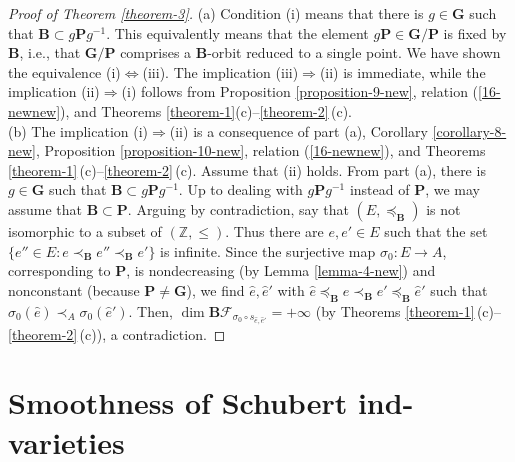 \documentclass[12pt]{amsart}
\theoremstyle{definition}
\begin{document}
\begin{proof}[Proof of Theorem \ref{theorem-3}]
{\rm (a)} Condition {\rm (i)} means that there is $g\in \mathbf{G}$ such that $\mathbf{B}\subset g\mathbf{P}g^{-1}$. This equivalently means that the element $g\mathbf{P}\in\mathbf{G}/\mathbf{P}$ is fixed by $\mathbf{B}$, i.e., that $\mathbf{G}/\mathbf{P}$ comprises a $\mathbf{B}$-orbit reduced to a single point. We have shown the equivalence {\rm (i)}$\Leftrightarrow${\rm (iii)}.
The implication {\rm (iii)}$\Rightarrow${\rm (ii)} is immediate, while
the implication {\rm (ii)}$\Rightarrow${\rm (i)} follows from Proposition \ref{proposition-9-new}, relation (\ref{16-newnew}), and Theorems \ref{theorem-1}{\rm (c)}--\ref{theorem-2}\,{\rm (c)}. \\
{\rm (b)} The implication {\rm (i)}$\Rightarrow${\rm (ii)} is a consequence of part {\rm (a)}, Corollary \ref{corollary-8-new}, Proposition \ref{proposition-10-new}, relation (\ref{16-newnew}), and Theorems \ref{theorem-1}\,{\rm (c)}--\ref{theorem-2}\,{\rm (c)}. Assume that {\rm (ii)} holds. From part (a), there is $g\in\mathbf{G}$ such that $\mathbf{B}\subset g\mathbf{P}g^{-1}$. Up to dealing with $g\mathbf{P}g^{-1}$ instead of $\mathbf{P}$, we may assume that $\mathbf{B}\subset\mathbf{P}$. Arguing by contradiction, say that $(E,\preceq_\mathbf{B})$ is not isomorphic to a subset of $(\mathbb{Z},\leq)$. Thus there are $e,e'\in E$ such that the set $\{e''\in E:e\prec_\mathbf{B}e''\prec_\mathbf{B}e'\}$ is infinite. Since the surjective map $\sigma_0:E\to A$, corresponding to $\mathbf{P}$, is nondecreasing (by Lemma \ref{lemma-4-new}) and nonconstant (because $\mathbf{P}\not=\mathbf{G}$), we find $\hat{e},\hat{e}'$ with $\hat{e}\preceq_\mathbf{B}e\prec_\mathbf{B}e'\preceq_\mathbf{B}\hat{e}'$ such that $\sigma_0(\hat{e})\prec_A\sigma_0(\hat{e}')$. Then, $\dim\mathbf{B}\mathcal{F}_{\sigma_0\circ s_{\hat{e},\hat{e}'}}=+\infty$ (by Theorems \ref{theorem-1}\,{\rm (c)}--\ref{theorem-2}\,{\rm (c)}), a contradiction.
\end{proof}





\section{Smoothness of Schubert ind-varieties}
\end{document}

